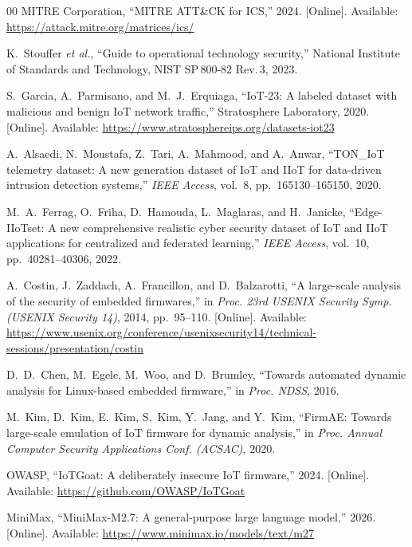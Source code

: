 \documentclass[conference,compsoc]{IEEEtran}
\begin{document}
\begin{thebibliography}{00}
 MITRE Corporation, ``MITRE ATT\&CK for ICS,'' 2024. [Online]. Available: \url{https://attack.mitre.org/matrices/ics/}

 K.~Stouffer \textit{et al.}, ``Guide to operational technology security,'' National Institute of Standards and Technology, NIST SP\,800-82 Rev.\,3, 2023.

 S.~Garcia, A.~Parmisano, and M.~J.~Erquiaga, ``IoT-23: A labeled dataset with malicious and benign IoT network traffic,'' Stratosphere Laboratory, 2020. [Online]. Available: \url{https://www.stratosphereips.org/datasets-iot23}

 A.~Alsaedi, N.~Moustafa, Z.~Tari, A.~Mahmood, and A.~Anwar, ``TON\_IoT telemetry dataset: A new generation dataset of IoT and IIoT for data-driven intrusion detection systems,'' \textit{IEEE Access}, vol.~8, pp.~165130--165150, 2020.

 M.~A.~Ferrag, O.~Friha, D.~Hamouda, L.~Maglaras, and H.~Janicke, ``Edge-IIoTset: A new comprehensive realistic cyber security dataset of IoT and IIoT applications for centralized and federated learning,'' \textit{IEEE Access}, vol.~10, pp.~40281--40306, 2022.

 A.~Costin, J.~Zaddach, A.~Francillon, and D.~Balzarotti, ``A large-scale analysis of the security of embedded firmwares,'' in \textit{Proc. 23rd USENIX Security Symp. (USENIX Security 14)}, 2014, pp.~95--110. [Online]. Available: \url{https://www.usenix.org/conference/usenixsecurity14/technical-sessions/presentation/costin}

 D.~D.~Chen, M.~Egele, M.~Woo, and D.~Brumley, ``Towards automated dynamic analysis for Linux-based embedded firmware,'' in \textit{Proc. NDSS}, 2016.

 M.~Kim, D.~Kim, E.~Kim, S.~Kim, Y.~Jang, and Y.~Kim, ``FirmAE: Towards large-scale emulation of IoT firmware for dynamic analysis,'' in \textit{Proc. Annual Computer Security Applications Conf. (ACSAC)}, 2020.

 OWASP, ``IoTGoat: A deliberately insecure IoT firmware,'' 2024. [Online]. Available: \url{https://github.com/OWASP/IoTGoat}

 MiniMax, ``MiniMax-M2.7: A general-purpose large language model,'' 2026. [Online]. Available: \url{https://www.minimax.io/models/text/m27}

\end{thebibliography}
\end{document}
